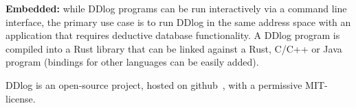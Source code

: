 \textbf{Embedded:} while DDlog programs can be run interactively via a
command line interface, the primary use case is to run DDlog in the
same address space with an application that requires deductive
database functionality.  A DDlog program is compiled into a Rust
library that can be linked against a Rust, C/C++ or Java program
(bindings for other languages can be easily added).

DDlog is an open-source project, hosted on github~\cite{ddlog}, with a permissive MIT-license.
